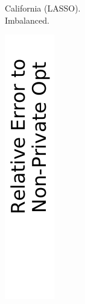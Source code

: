 \begin{figure}[t]
\begin{subfigure}{0.3\linewidth}
    \caption{California (LASSO).\\ Imbalanced.}
    \label{fig:expe-time-california-raw}
  \end{subfigure}
  \begin{subfigure}{0.045\linewidth}
    \centering
    \includegraphics[width=\linewidth]{plots/xlegend.pdf}

\end{subfigure}
\end{figure}
